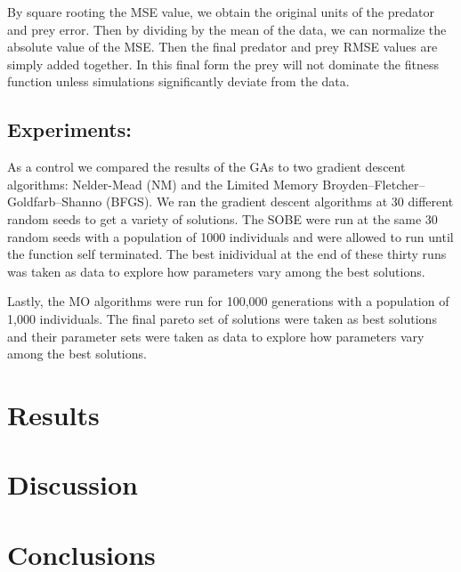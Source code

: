 \documentclass[twocolumn, 12pt]{article}
\begin{document}
By square rooting the MSE value, we obtain the original units of the predator and prey error. Then by dividing by the mean of the data, we can normalize the absolute value of the MSE. Then the final predator and prey RMSE values are simply added together. In this final form the prey will not dominate the fitness function unless simulations significantly deviate from the data.  

\subsection{Experiments:}

As a control we compared the results of the GAs to two gradient descent algorithms: Nelder-Mead (NM) and the Limited Memory Broyden–Fletcher–Goldfarb–Shanno (BFGS). We ran the gradient descent algorithms at 30 different random seeds to get a variety of solutions. The SOBE were run at the same 30 random seeds with a population of 1000 individuals and were allowed to run until the function self terminated. The best inidividual at the end of these thirty runs was taken as data to explore how parameters vary among the best solutions.

Lastly, the MO algorithms were run for 100,000 generations with a population of 1,000 individuals. The final pareto set of solutions were taken as best solutions and their parameter sets were taken as data to explore how parameters vary among the best solutions.


\section{Results}

\section{Discussion}

\section{Conclusions}




\onecolumn
\end{document}
